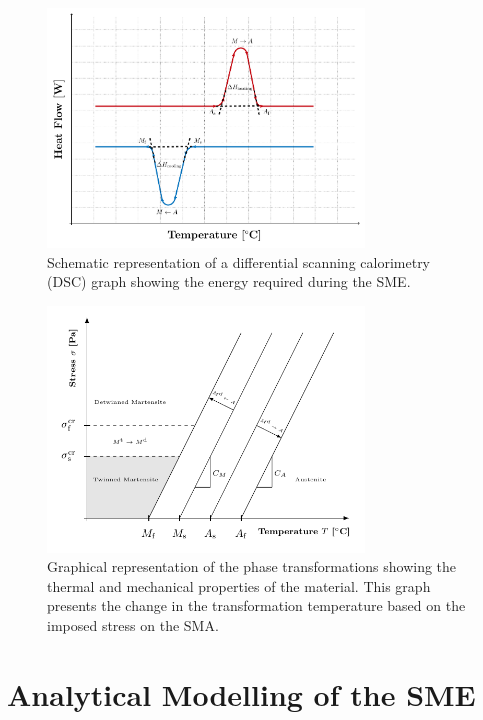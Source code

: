 \begin{figure}[hbt]
    \centering
    \includegraphics[width=0.75\textwidth]{images/chap2/dsc-graph.pdf}
    \caption{Schematic representation of a differential scanning calorimetry (DSC) graph showing the energy required during the SME.}
    \label{fig:dsc-graph}
\end{figure}

\begin{figure}[hbt]
    \centering
    \includegraphics[width=0.75\textwidth]{images/chap2/phase-diagram-graph.pdf}
    \caption{Graphical representation of the phase transformations showing the thermal and mechanical properties of the material. This graph presents the change in the transformation temperature based on the imposed stress on the SMA.}
    \label{fig:phase-diagram-graph}
\end{figure}

\section{Analytical Modelling of the SME}

